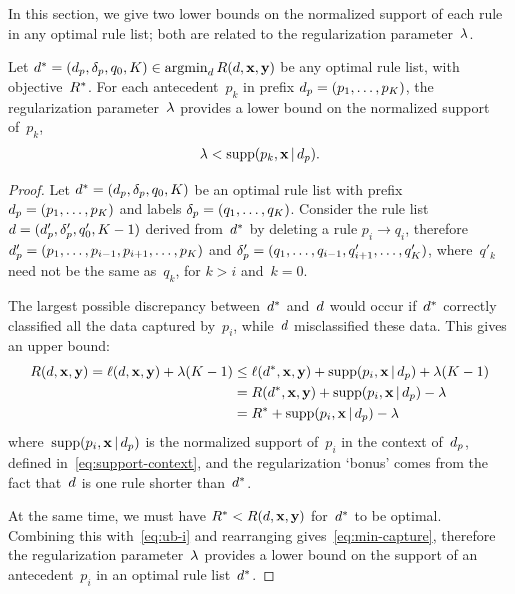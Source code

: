 In this section, we give two lower bounds on the normalized support
of each rule in any optimal rule list;
both are related to the regularization parameter~${\lambda}$.

\begin{theorem}
\label{thm:min-capture}
Let ${d^* = (d_p, \delta_p, q_0, K) \in \operatorname*{argmin}_{d} R({d}, \mathbf{x}, \mathbf{y})}$
be any optimal rule list, with objective~$R^*$.
%
For each antecedent~$p_k$ in prefix ${d_p = (p_1, \dots, p_K)}$,
the regularization parameter~${\lambda}$ provides a lower bound
on the normalized support of~$p_k$,
\begin{align}
\Reg < \Supp(p_k, \x \given \Prefix).
\label{eq:min-capture}
\end{align}
\end{theorem}

\begin{proof}
Let ${d^* = (d_p, \delta_p, q_0, K)}$ be an optimal
rule list with prefix ${d_p = (p_1, \dots, p_K)}$
and labels ${\delta_p = (q_1, \dots, q_K)}$.
%
Consider the rule list ${{d} =  (d_p', \delta_p', q_0', K-1)}$
derived from~$d^*$ by deleting a rule ${p_i \rightarrow q_i}$,
therefore ${d_p' = (p_1, \dots, p_{i-1}, p_{i+1}, \dots, p_K)}$
and ${\delta_p' = (q_1, \dots, q_{i-1}, q'_{i+1}, \dots, q'_K)}$,
where~$q'_k$ need not be the same as~$q_k$, for ${k > i}$ and~${k = 0}$.

The largest possible discrepancy between~$d^*$ and~${d}$ would occur
if~$d^*$ correctly classified all the data captured by~$p_i$,
while~${d}$ misclassified these data.
%
This gives an upper bound:
\begin{align}
\Obj(\RL, \x, \y) = \Loss(\RL, \x, \y) + \Reg (K - 1)
&\le \Loss(\OptimalRL, \x, \y) + \Supp(p_i, \x \given \Prefix) + \Reg(K - 1) \nn \\
&= \Obj(\OptimalRL, \x, \y) + \Supp(p_i, \x \given \Prefix) - \Reg \nn \\
&= \OptimalObj + \Supp(p_i, \x \given \Prefix) - \Reg
\label{eq:ub-i}
\end{align}
where~$\textnormal{supp}(p_i, \mathbf{x} \,|\, d_p)$ is the normalized support of~$p_i$
in the context of~$d_p$, defined in~\eqref{eq:support-context},
and the regularization `bonus' comes from the fact that~${d}$
is one rule shorter than~$d^*$.

At the same time, we must have ${R^* < R({d}, \mathbf{x}, \mathbf{y})}$ for~$d^*$ to be optimal.
%
Combining this with~\eqref{eq:ub-i} and rearranging gives~\eqref{eq:min-capture},
therefore the regularization parameter~${\lambda}$ provides a lower bound
on the support of an antecedent~$p_i$ in an optimal rule list~$d^*$.
\end{proof}

